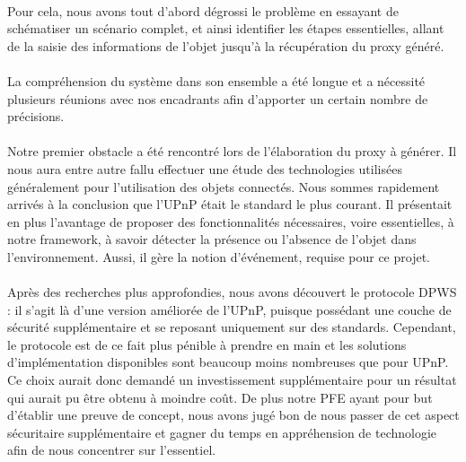 \documentclass[nocopyrightspace]{sigplanconf}
\begin{document}
			\paragraph{}
			Pour cela, nous avons tout d’abord dégrossi le problème en essayant de schématiser un scénario complet, et ainsi identifier les étapes essentielles, allant de la saisie des informations de l’objet jusqu’à la récupération du proxy généré.

			\paragraph{}
			La compréhension du système dans son ensemble a été longue et a nécessité plusieurs réunions avec nos encadrants afin d’apporter un certain nombre de précisions. 

			\paragraph{}
			Notre premier obstacle a été rencontré lors de l’élaboration du proxy à générer. Il nous aura entre autre fallu effectuer une étude des technologies utilisées généralement pour l’utilisation des objets connectés. Nous sommes rapidement arrivés à la conclusion que l’UPnP\cite{upnp} était le standard le plus courant. Il présentait en plus l’avantage de proposer des fonctionnalités nécessaires, voire essentielles, à notre framework, à savoir détecter la présence ou l’absence de l’objet dans l’environnement. Aussi, il gère la notion d’événement, requise pour ce projet.

			\paragraph{}
			Après des recherches plus approfondies, nous avons découvert le protocole DPWS\cite{dpws} : il s’agit là d’une version améliorée de l’UPnP, puisque possédant une couche de sécurité supplémentaire et se reposant uniquement sur des standards. Cependant, le protocole est de ce fait plus pénible à prendre en main et les solutions d’implémentation disponibles sont beaucoup moins nombreuses que pour UPnP. Ce choix aurait donc demandé un investissement supplémentaire pour un résultat qui aurait pu être obtenu à moindre coût. De plus notre PFE ayant pour but d’établir une preuve de concept, nous avons jugé bon de nous passer de cet aspect sécuritaire supplémentaire et gagner du temps en appréhension de technologie afin de nous concentrer sur l’essentiel.
\end{document}
